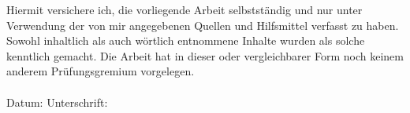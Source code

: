 \label{erklaerung}

Hiermit versichere ich, die vorliegende Arbeit selbstständig und nur unter Verwendung der von mir angegebenen Quellen und Hilfsmittel verfasst zu haben. Sowohl inhaltlich als auch wörtlich entnommene Inhalte wurden als solche kenntlich gemacht. Die Arbeit hat in dieser oder vergleichbarer Form noch keinem anderem Prüfungsgremium vorgelegen. \\
\\[1.5cm]
Datum:	\hrulefill\enspace Unterschrift: \hrulefill
\\[3.5cm]